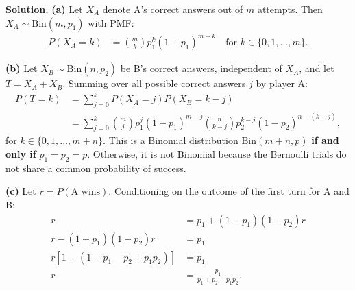 \documentclass[11pt,a4paper]{article}
\begin{document}
\noindent \textbf{Solution.} \textbf{(a)} Let $X_A$ denote A's correct answers out of $m$ attempts. Then $X_A \sim \text{Bin}(m, p_1)$ with PMF:
\begin{align*}
P(X_A = k) &= \binom{m}{k} p_1^k (1 - p_1)^{m-k} \quad \text{for } k \in \{0, 1, \dots, m\}.
\end{align*}

\vspace{4pt}
\noindent \textbf{(b)} Let $X_B \sim \text{Bin}(n, p_2)$ be B's correct answers, independent of $X_A$, and let $T = X_A + X_B$. Summing over all possible correct answers $j$ by player A:
\begin{align*}
P(T = k) &= \sum_{j=0}^{k} P(X_A = j) P(X_B = k - j) \\
&= \sum_{j=0}^{k} \binom{m}{j} p_1^j (1 - p_1)^{m-j} \binom{n}{k-j} p_2^{k-j} (1 - p_2)^{n-(k-j)},
\end{align*}
for $k \in \{0, 1, \dots, m+n\}$. This is a Binomial distribution $\text{Bin}(m+n, p)$ \textbf{if and only if} $p_1 = p_2 = p$. Otherwise, it is not Binomial because the Bernoulli trials do not share a common probability of success.

\vspace{4pt}
\noindent \textbf{(c)} Let $r = P(\text{A wins})$. Conditioning on the outcome of the first turn for A and B:
\begin{align*}
r &= p_1 + (1 - p_1)(1 - p_2) r \\
r - (1 - p_1)(1 - p_2) r &= p_1 \\
r \left[ 1 - (1 - p_1 - p_2 + p_1 p_2) \right] &= p_1 \\
r &= \frac{p_1}{p_1 + p_2 - p_1 p_2}.
\end{align*}

\vspace{10pt}
\end{document}
